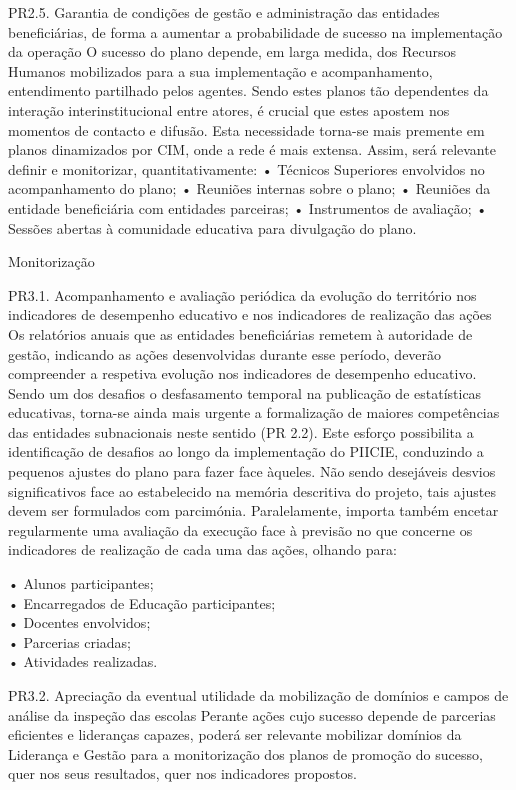\documentclass[
]{book}
\begin{document}
PR2.5. Garantia de condições de gestão e administração das entidades beneficiárias, de forma a aumentar a probabilidade de sucesso na implementação da operação
O sucesso do plano depende, em larga medida, dos Recursos Humanos mobilizados para a sua implementação e acompanhamento, entendimento partilhado pelos agentes. Sendo estes planos tão dependentes da interação interinstitucional entre atores, é crucial que estes apostem nos momentos de contacto e difusão. Esta necessidade torna-se mais premente em planos dinamizados por CIM, onde a rede é mais extensa.
Assim, será relevante definir e monitorizar, quantitativamente:
• Técnicos Superiores envolvidos no acompanhamento do plano;
• Reuniões internas sobre o plano;
• Reuniões da entidade beneficiária com entidades parceiras;
• Instrumentos de avaliação;
• Sessões abertas à comunidade educativa para divulgação do plano.

Monitorização

PR3.1. Acompanhamento e avaliação periódica da evolução do território nos indicadores de desempenho educativo e nos indicadores de realização das ações
Os relatórios anuais que as entidades beneficiárias remetem à autoridade de gestão, indicando as ações desenvolvidas durante esse período, deverão compreender a respetiva evolução nos indicadores de desempenho educativo. Sendo um dos desafios o desfasamento temporal na publicação de estatísticas educativas, torna-se ainda mais urgente a formalização de maiores competências das entidades subnacionais neste sentido (PR 2.2).
Este esforço possibilita a identificação de desafios ao longo da implementação do PIICIE, conduzindo a pequenos ajustes do plano para fazer face àqueles. Não sendo desejáveis desvios significativos face ao estabelecido na memória descritiva do projeto, tais ajustes devem ser formulados com parcimónia.
Paralelamente, importa também encetar regularmente uma avaliação da execução face à previsão no que concerne os indicadores de realização de cada uma das ações, olhando para:

• Alunos participantes;\\
• Encarregados de Educação participantes;\\
• Docentes envolvidos;\\
• Parcerias criadas;\\
• Atividades realizadas.

PR3.2. Apreciação da eventual utilidade da mobilização de domínios e campos de análise da inspeção das escolas
Perante ações cujo sucesso depende de parcerias eficientes e lideranças capazes, poderá ser relevante mobilizar domínios da Liderança e Gestão para a monitorização dos planos de promoção do sucesso, quer nos seus resultados, quer nos indicadores propostos.
\end{document}
